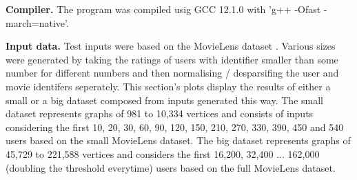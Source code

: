 \documentclass[letterpaper]{article}
\newcommand{\mypar}[1]{{\bf #1.}}
\begin{document}
\mypar{Compiler} The program was compiled usig GCC 12.1.0 with 'g++ -Ofast -march=native'.

\mypar{Input data} Test inputs were based on the MovieLens dataset \cite{movieLens}.
Various sizes were generated by taking the ratings of users with identifier smaller than some number for different numbers
and then normalising / desparsifing the user and movie identifers seperately.
This section's plots display the results of either a small or a big dataset composed from inputs generated this way.
The small dataset represents graphs of 981 to 10,334 vertices and consists of inputs %
considering the first 10, 20, 30, 60, 90, 120, 150, 210, 270, 330, 390, 450 and 540 users based on the small MovieLens dataset.
The big dataset represents graphs of 45,729 to 221,588 vertices and considers the first 16,200, 32,400 ... 162,000 (doubling the threshold everytime) users based on the full MovieLens dataset.
\end{document}
